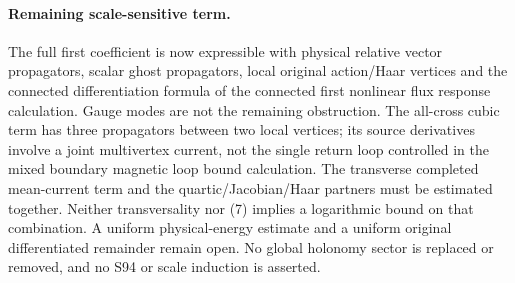 \documentclass[11pt]{article}
\begin{document}
\paragraph{Remaining scale-sensitive term.}
The full first coefficient is now expressible with physical relative
vector propagators, scalar ghost propagators, local original action/Haar
vertices and the connected differentiation formula of the connected first nonlinear flux response calculation. Gauge modes
are not the remaining obstruction. The all-cross cubic term has three
propagators between two local vertices; its source derivatives involve a
joint multivertex current, not the single return loop controlled in the mixed boundary magnetic loop bound calculation.
The transverse completed mean-current term and the quartic/Jacobian/Haar
partners must be estimated together. Neither transversality nor (7)
implies a logarithmic bound on that combination. A uniform physical-energy
estimate and a uniform original differentiated remainder remain open.
No global holonomy sector is replaced or removed, and no S94 or scale
induction is asserted.
\end{document}
